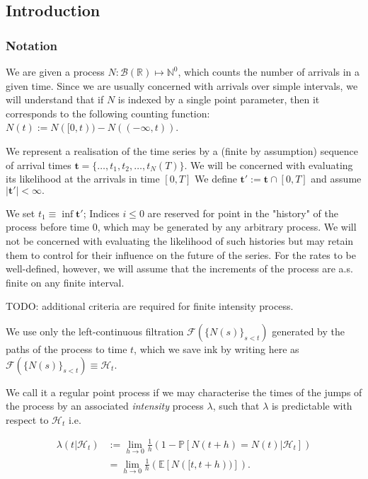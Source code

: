 \documentclass[11pt]{article}
\newcommand{\bb}[1]{\mathbb{#1}}
\renewcommand{\v}[1]{\boldsymbol{#1}}
\newcommand{\cc}[1]{\mathcal{#1}}
\renewcommand{\cc}[1]{\mathcal{#1}}
\begin{document}
    \subsection{Introduction}\label{introduction}

\subsubsection{Notation}\label{notation}

We are given a process \(N:\cc{B}(\bb{R})\mapsto \bb{N}^0\), which
counts the number of arrivals in a given time. Since we are usually
concerned with arrivals over simple intervals, we will understand that
if \(N\) is indexed by a single point parameter, then it corresponds to
the following counting function: \(N(t):=N([0,t))-N((-\infty, t))\).

We represent a realisation of the time series by a (finite by
assumption) sequence of arrival times
\(\v{t}=\{\dots,t_1, t_2,\dots,t_N(T)\}.\) We will be concerned with
evaluating its likelihood at the arrivals in time \([0,T]\) We define
\(\v{t}':=\v{t}\cap [0,T]\) and assume \(\left|\v{t}'\right|<\infty.\)

We set \(t_1\equiv \inf \v{t}'\); Indices \(i\leq 0\) are reserved for
point in the "history" of the process before time \(0\), which may be
generated by any arbitrary process. We will not be concerned with
evaluating the likelihood of such histories but may retain them to
control for their influence on the future of the series. For the rates
to be well-defined, however, we will assume that the increments of the
process are a.s. finite on any finite interval.

TODO: additional criteria are required for finite intensity process.

    We use only the left-continuous filtration
\(\mathcal{F}(\{N(s)\}_{s < t})\) generated by the paths of the process
to time \(t\), which we save ink by writing here as
\(\mathcal{F}(\{N(s)\}_{s < t}) \equiv \cc{H}_t.\)

We call it a regular point process if we may characterise the times of
the jumps of the process by an associated \emph{intensity} process
\(\lambda\), such that \(\lambda\) is predictable with respect to
\(\cc{H}_t\) i.e. \cite{daley_introduction_2003}

\[\begin{aligned}\lambda(t|\cc{H}_t)&:=\lim_{h\to 0} \frac{1}{h}\left(1-\bb P\left[N(t+h)=N(t)|\cc{H}_t\right] \right)\\
&=\lim_{h\to 0} \frac{1}{h}\left(\bb E \left[N([t,t+h))\right]\right).\end{aligned}\]
\end{document}
